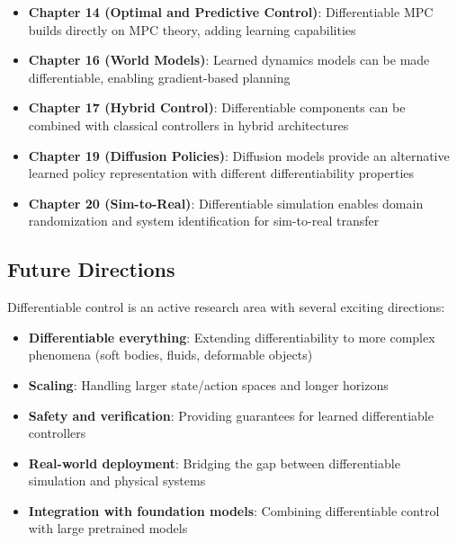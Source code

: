 \begin{itemize}
    \item \textbf{Chapter 14 (Optimal and Predictive Control)}: Differentiable MPC builds directly on MPC theory, adding learning capabilities

    \item \textbf{Chapter 16 (World Models)}: Learned dynamics models can be made differentiable, enabling gradient-based planning

    \item \textbf{Chapter 17 (Hybrid Control)}: Differentiable components can be combined with classical controllers in hybrid architectures

    \item \textbf{Chapter 19 (Diffusion Policies)}: Diffusion models provide an alternative learned policy representation with different differentiability properties

    \item \textbf{Chapter 20 (Sim-to-Real)}: Differentiable simulation enables domain randomization and system identification for sim-to-real transfer
\end{itemize}

\subsection{Future Directions}

Differentiable control is an active research area with several exciting directions:

\begin{itemize}
    \item \textbf{Differentiable everything}: Extending differentiability to more complex phenomena (soft bodies, fluids, deformable objects)

    \item \textbf{Scaling}: Handling larger state/action spaces and longer horizons

    \item \textbf{Safety and verification}: Providing guarantees for learned differentiable controllers

    \item \textbf{Real-world deployment}: Bridging the gap between differentiable simulation and physical systems

    \item \textbf{Integration with foundation models}: Combining differentiable control with large pretrained models
\end{itemize}

